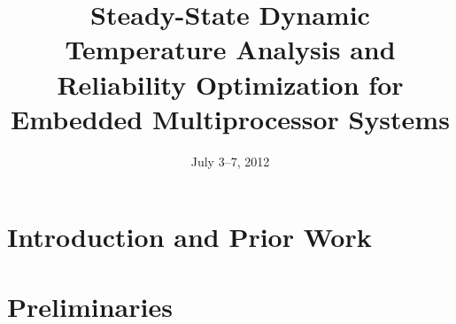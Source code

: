 \documentclass{sig-alternate}
\begin{document}

  \title{Steady-State Dynamic Temperature Analysis and Reliability Optimization for Embedded Multiprocessor Systems}

  \author{}

  \date{July 3--7, 2012}

  \maketitle

  \begin{abstract}
    
  \end{abstract}




  \section{Introduction and Prior Work}
  

  \section{Preliminaries} \label{sec:preliminaries}
  
\end{document}
